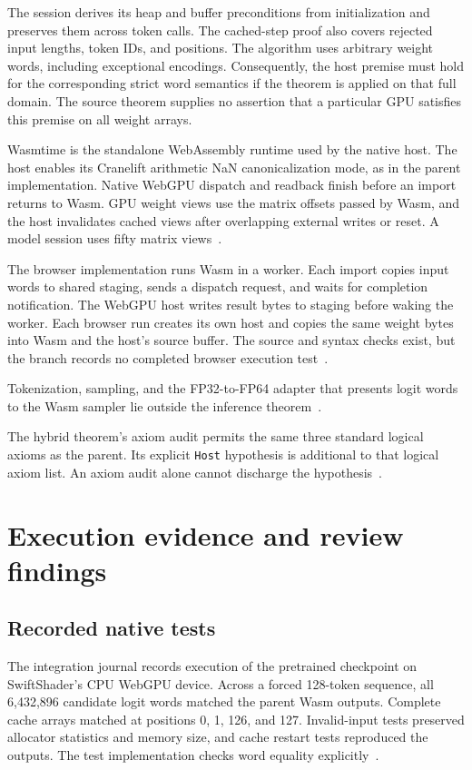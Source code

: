 \documentclass[11pt]{article}
\newcommand{\code}[1]{\texttt{#1}}
\begin{document}
The session derives its heap and buffer preconditions from initialization and preserves them across token calls.  The cached-step proof also covers rejected input lengths, token IDs, and positions.  The algorithm uses arbitrary weight words, including exceptional encodings.  Consequently, the host premise must hold for the corresponding strict word semantics if the theorem is applied on that full domain.  The source theorem supplies no assertion that a particular GPU satisfies this premise on all weight arrays.

Wasmtime is the standalone WebAssembly runtime used by the native host.  The host enables its Cranelift arithmetic NaN canonicalization mode, as in the parent implementation.  Native WebGPU dispatch and readback finish before an import returns to Wasm.  GPU weight views use the matrix offsets passed by Wasm, and the host invalidates cached views after overlapping external writes or reset.  A model session uses fifty matrix views~\cite{host}.

The browser implementation runs Wasm in a worker.  Each import copies input words to shared staging, sends a dispatch request, and waits for completion notification.  The WebGPU host writes result bytes to staging before waking the worker.  Each browser run creates its own host and copies the same weight bytes into Wasm and the host's source buffer.  The source and syntax checks exist, but the branch records no completed browser execution test~\cite{host,journal}.

Tokenization, sampling, and the FP32-to-FP64 adapter that presents logit words to the Wasm sampler lie outside the inference theorem~\cite{build}.

The hybrid theorem's axiom audit permits the same three standard logical axioms as the parent.  Its explicit \code{Host} hypothesis is additional to that logical axiom list.  An axiom audit alone cannot discharge the hypothesis~\cite{composition}.


\section{Execution evidence and review findings}

\subsection{Recorded native tests}

The integration journal records execution of the pretrained checkpoint on SwiftShader's CPU WebGPU device.  Across a forced 128-token sequence, all 6,432,896 candidate logit words matched the parent Wasm outputs.  Complete cache arrays matched at positions 0, 1, 126, and 127.  Invalid-input tests preserved allocator statistics and memory size, and cache restart tests reproduced the outputs.  The test implementation checks word equality explicitly~\cite{journal,tests}.
\end{document}
